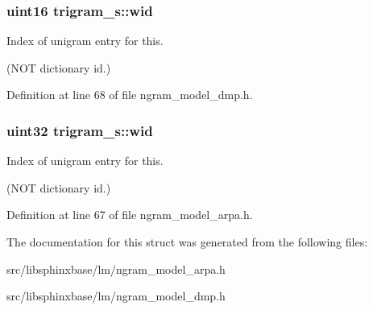\subsubsection[{wid}]{\setlength{\rightskip}{0pt plus 5cm}uint16 {\bf trigram\_\-s::wid}}\label{structtrigram__s_d90726c9d1c5b2d564205b4feddcb674}


Index of unigram entry for this. 

(NOT dictionary id.) 

Definition at line 68 of file ngram\_\-model\_\-dmp.h.
\subsubsection[{wid}]{\setlength{\rightskip}{0pt plus 5cm}uint32 {\bf trigram\_\-s::wid}}\label{structtrigram__s_492e1fedb16fa11d26a941177c1305be}


Index of unigram entry for this. 

(NOT dictionary id.) 

Definition at line 67 of file ngram\_\-model\_\-arpa.h.

The documentation for this struct was generated from the following files:\begin{CompactItemize}
\item 
src/libsphinxbase/lm/ngram\_\-model\_\-arpa.h\item 
src/libsphinxbase/lm/ngram\_\-model\_\-dmp.h\end{CompactItemize}
